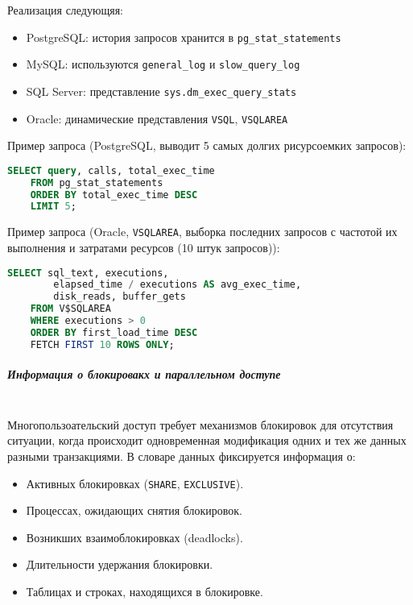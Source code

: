 Реализация следующяя:
\begin{itemize}
    \item PostgreSQL: история запросов хранится в \texttt{pg\_stat\_statements} \autocite{PgStatStatements1}
    \item MySQL: используются \texttt{general\_log} и \texttt{slow\_query\_log} \autocite{Mysqldoc3}
    \item SQL Server: представление \texttt{sys.dm\_exec\_query\_stats} \autocite{MicrosoftLearnSQLserverQueryStat}
    \item Oracle: динамические представления \texttt{V\textdollar SQL}, \texttt{V\textdollar SQLAREA} \autocite[c.9 §46-49, c.9 §71]{oracledbdoc2}
\end{itemize}

Пример запроса (PostgreSQL, выводит 5 самых долгих рисурсоемких запросов):
\begin{lstlisting}[language=SQL]
    SELECT query, calls, total_exec_time 
    FROM pg_stat_statements 
    ORDER BY total_exec_time DESC 
    LIMIT 5;                 
\end{lstlisting}

Пример запроса (Oracle, \texttt{V\textdollar SQLAREA}, выборка последних запросов с частотой их выполнения и затратами ресурсов (10 штук запросов)):
\begin{lstlisting}[language=SQL]
    SELECT sql_text, executions, 
        elapsed_time / executions AS avg_exec_time, 
        disk_reads, buffer_gets 
    FROM V$SQLAREA 
    WHERE executions > 0 
    ORDER BY first_load_time DESC 
    FETCH FIRST 10 ROWS ONLY;
\end{lstlisting}

\subparagraph{Информация о блокировакх и параллельном доступе} ~\\

Многопользоательский доступ требует механизмов блокировок для отсутствия ситуации, когда происходит одновременная модификация одних и тех же данных разными транзакциями. В словаре данных фиксируется информация о:
\begin{itemize}
    \item Активных блокировках (\texttt{SHARE}, \texttt{EXCLUSIVE}).
    \item Процессах, ожидающих снятия блокировок.
    \item Возникших взаимоблокировках (deadlocks).
    \item Длительности удержания блокировки.
    \item Таблицах и строках, находящихся в блокировке.
\end{itemize}

